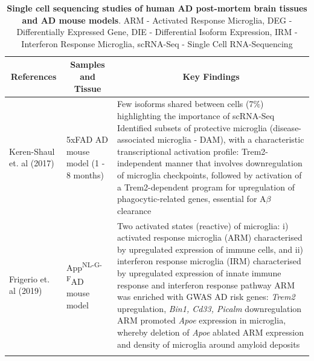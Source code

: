 \begin{changemargin}{1.5cm}
	\begin{landscape}
		\small %
		\setlength\tabcolsep{2pt} %
		\renewcommand{\arraystretch}{1}
		\begin{longtable}[c]{p{4cm}p{4cm}p{18cm}}
			\caption[Single cell sequencing studies of human AD post-mortem brain tissues and AD mouse models]%
			{\textbf{Single cell sequencing studies of human AD post-mortem brain tissues and AD mouse models}. ARM - Activated Response Microglia, DEG - Differentially Expressed Gene, DIE - Differential Isoform Expression, IRM - Interferon Response Microglia, scRNA-Seq - Single Cell RNA-Sequencing}
			\label{tab: longread_AD_advancedstudies}\\
			
			\toprule
			\multicolumn{1}{c}{References} &
			\multicolumn{1}{c}{Samples and Tissue} &
			\multicolumn{1}{c}{Key Findings} \\* \midrule
			\endfirsthead
			\endhead
			\bottomrule
			\endfoot
			\endlastfoot
			\centering Keren-Shaul et. al (2017)\cite{Keren-Shaul2017} &
			\centering 5xFAD AD mouse model (1 - 8 months) &
			\tabitem Few isoforms shared between cells (7\%) highlighting the importance of scRNA-Seq \newline
			\tabitem Identified subsets of protective microglia (disease-associated microglia - DAM), with a characteristic transcriptional activation profile:  Trem2-independent manner that involves downregulation of microglia checkpoints, followed by activation of a Trem2-dependent program for upregulation of phagocytic-related genes, essential for A$\beta$ clearance  \\
			\hdashline[0.5pt/5pt]	
			
			\centering Frigerio et. al (2019)\cite{Frigerio2019} &
			\centering App\textsuperscript{NL-G-F}\newline AD mouse model  &
			\tabitem Two activated states (reactive) of microglia: i) activated response microglia (ARM) characterised by upregulated expression of immune cells, and ii) interferon response microglia (IRM) characterised by upregulated expression of innate immune response and interferon response pathway  \newline
			\tabitem ARM was enriched with GWAS AD risk genes: \textit{Trem2} upregulation, \textit{Bin1, Cd33, Picalm} downregulation  \newline
			\tabitem ARM promoted \textit{Apoe} expression in microglia, whereby deletion of \textit{Apoe} ablated ARM expression and density of microglia around amyloid deposits \\
			\hdashline[0.5pt/5pt]
			

\end{longtable}
\end{landscape}
\end{changemargin}
